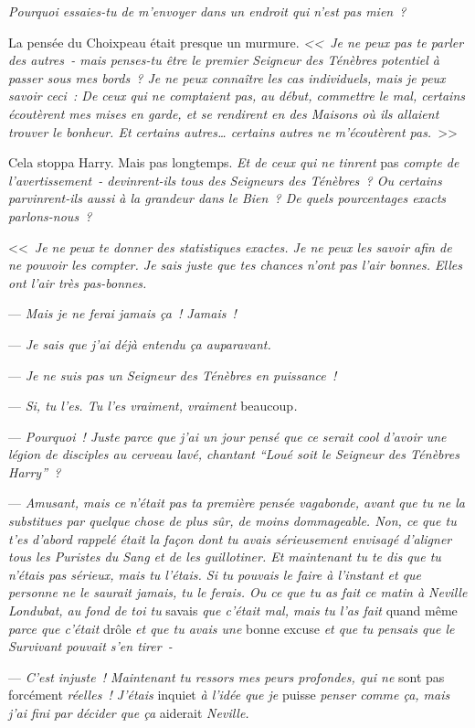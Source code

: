 \emph{Pourquoi essaies-tu de m'envoyer dans un endroit qui n'est pas mien~?}

La pensée du Choixpeau était presque un murmure. \emph{<<~Je ne peux pas te parler des autres~- mais penses-tu être le premier Seigneur des Ténèbres potentiel à passer sous mes bords~? Je ne peux connaître les cas individuels, mais je peux savoir ceci~: De ceux qui ne comptaient pas, au début, commettre le mal, certains écoutèrent mes mises en garde, et se rendirent en des Maisons où ils allaient trouver le bonheur. Et certains autres… certains autres ne m'écoutèrent pas.}~>>

Cela stoppa Harry. Mais pas longtemps. \emph{Et de ceux qui ne tinrent} pas \emph{compte de l'avertissement~- devinrent-ils tous des Seigneurs des Ténèbres~? Ou certains parvinrent-ils aussi à la grandeur dans le Bien~? De quels pourcentages exacts parlons-nous~?}

<<~\emph{Je ne peux te donner des statistiques exactes. Je ne peux les savoir afin de ne pouvoir les compter. Je sais juste que tes chances n'ont pas l'air bonnes. Elles ont l'air très pas-bonnes.}

--- \emph{Mais je ne ferai jamais ça~! Jamais~!}

--- \emph{Je sais que j'ai déjà entendu ça auparavant.}

--- \emph{Je ne suis pas un Seigneur des Ténèbres en puissance~!}

--- \emph{Si, tu l'es. Tu l'es vraiment, vraiment} beaucoup\emph{.}

--- \emph{Pourquoi~! Juste parce que j'ai un jour pensé que ce serait cool d'avoir une légion de disciples au cerveau lavé, chantant “Loué soit le Seigneur des Ténèbres Harry”~?}

--- \emph{Amusant, mais ce n'était pas ta première pensée vagabonde, avant que tu ne la substitues par quelque chose de plus sûr, de moins dommageable. Non, ce que tu t'es d'abord rappelé était la façon dont tu avais sérieusement envisagé d'aligner tous les Puristes du Sang et de les guillotiner. Et maintenant tu te dis que tu n'étais pas sérieux, mais tu l'étais. Si tu pouvais le faire à l'instant et que personne ne le saurait jamais, tu le ferais. Ou ce que tu as fait ce matin à Neville Londubat, au fond de toi tu} savais \emph{que c'était mal, mais tu l'as fait} quand même \emph{parce que c'était} drôle \emph{et que tu avais une} bonne excuse \emph{et que tu pensais que le Survivant pouvait s'en tirer~-}

--- \emph{C'est injuste~! Maintenant tu ressors mes peurs profondes, qui ne} sont pas forcément \emph{réelles~! J'étais} inquiet \emph{à l'idée que je} puisse \emph{penser comme ça, mais j'ai fini par décider que ça} aiderait \emph{Neville.}

